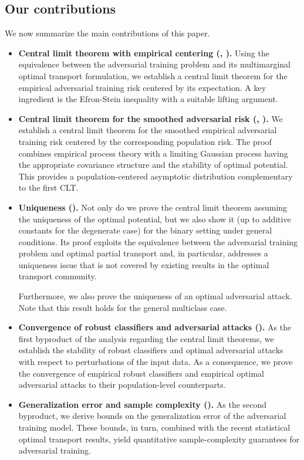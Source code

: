 \documentclass{amsart}
\theoremstyle{plain}
\numberwithin{equation}{section}\newtheorem{theorem}{Theorem}[section]
\theoremstyle{remark}
\begin{document}
\subsection{Our contributions}

We now summarize the main contributions of this paper.

\begin{itemize}
\item \textbf{Central limit theorem with empirical centering (, ).}
Using the equivalence between the adversarial training problem and its multimarginal optimal transport formulation, we establish a central limit theorem for the empirical adversarial training risk centered by its expectation. A key ingredient is the Efron-Stein inequality with a suitable lifting argument.


\item \textbf{Central limit theorem for the smoothed adversarial risk (, ).}
We establish a central limit theorem for the smoothed empirical adversarial training risk centered by the corresponding population risk. The proof combines empirical process theory with a limiting Gaussian process having the appropriate covariance structure and the stability of optimal potential. This provides a population-centered asymptotic distribution complementary to the first CLT.



\item \textbf{Uniqueness ().}
Not only do we prove the central limit theorem assuming the uniqueness of the optimal potential, but we also show it (up to additive constants for the degenerate case) for the binary setting under general conditions. Its proof exploits the equivalence between the adversarial training problem and optimal partial transport and, in particular, addresses a uniqueness issue that is not covered by existing results in the optimal transport community.


Furthermore, we also prove the uniqueness of an optimal adversarial attack. Note that this result holds for the general multiclass case.




\item \textbf{Convergence of robust classifiers and adversarial attacks ().}
As the first byproduct of the analysis regarding the central limit theorems, we establish the stability of robust classifiers and optimal adversarial attacks with respect to perturbations of the input data. As a consequence, we prove the convergence of empirical robust classifiers and empirical optimal adversarial attacks to their population-level counterparts.


\item \textbf{Generalization error and sample complexity ().}
As the second byproduct, we derive bounds on the generalization error of the adversarial training model. These bounds, in turn, combined with the recent statistical optimal transport results, yield quantitative sample-complexity guarantees for adversarial training.
\end{itemize}
\end{document}
